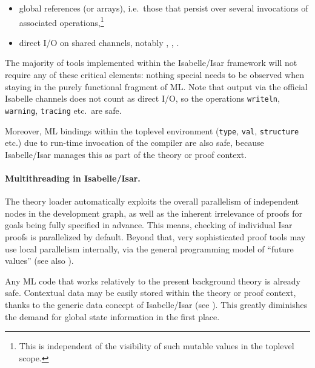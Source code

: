 \begin{isabellebody}
\begin{isamarkuptext}
  \begin{itemize}

  \item global references (or arrays), i.e.\ those that persist over
  several invocations of associated operations,\footnote{This is
  independent of the visibility of such mutable values in the toplevel
  scope.}

  \item direct I/O on shared channels, notably , , .

  \end{itemize}

  The majority of tools implemented within the Isabelle/Isar framework
  will not require any of these critical elements: nothing special
  needs to be observed when staying in the purely functional fragment
  of ML.  Note that output via the official Isabelle channels does not
  count as direct I/O, so the operations \verb|writeln|, \verb|warning|, \verb|tracing| etc.\ are safe.

  Moreover, ML bindings within the toplevel environment (\verb|type|, \verb|val|, \verb|structure| etc.) due to
  run-time invocation of the compiler are also safe, because
  Isabelle/Isar manages this as part of the theory or proof context.

  \paragraph{Multithreading in Isabelle/Isar.}  The theory loader
  automatically exploits the overall parallelism of independent nodes
  in the development graph, as well as the inherent irrelevance of
  proofs for goals being fully specified in advance.  This means,
  checking of individual Isar proofs is parallelized by default.
  Beyond that, very sophisticated proof tools may use local
  parallelism internally, via the general programming model of
  ``future values'' (see also \hyperlink{file.~~/src/Pure/Concurrent/future.ML}{\mbox{}}).

  Any ML code that works relatively to the present background theory
  is already safe.  Contextual data may be easily stored within the
  theory or proof context, thanks to the generic data concept of
  Isabelle/Isar (see ).  This greatly
  diminishes the demand for global state information in the first
  place.


\end{isamarkuptext}
\end{isabellebody}
